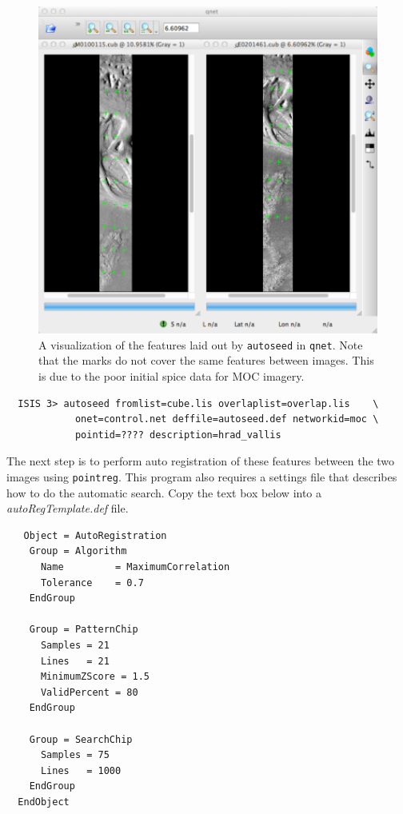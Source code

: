 \begin{figure}[ht]
  \centering
  \includegraphics[width=5in]{images/qnet/Qnet_AfterAutoseed_400px.png}
  \caption{A visualization of the features laid out by
    \texttt{autoseed} in \texttt{qnet}. Note that the marks do not
    cover the same features between images. This is due to the poor
    initial spice data for MOC imagery.}
  \label{fig:after_autoseed}
\end{figure}

\begin{verbatim}
  ISIS 3> autoseed fromlist=cube.lis overlaplist=overlap.lis    \
            onet=control.net deffile=autoseed.def networkid=moc \
            pointid=???? description=hrad_vallis
\end{verbatim}

The next step is to perform auto registration of these features
between the two images using \texttt{pointreg}. This program also
requires a settings file that describes how to do the automatic
search. Copy the text box below into a \textit{autoRegTemplate.def}
file.

\begin{verbatim}
   Object = AutoRegistration
    Group = Algorithm
      Name         = MaximumCorrelation
      Tolerance    = 0.7
    EndGroup

    Group = PatternChip
      Samples = 21
      Lines   = 21
      MinimumZScore = 1.5
      ValidPercent = 80
    EndGroup

    Group = SearchChip
      Samples = 75
      Lines   = 1000
    EndGroup
  EndObject
\end{verbatim}

